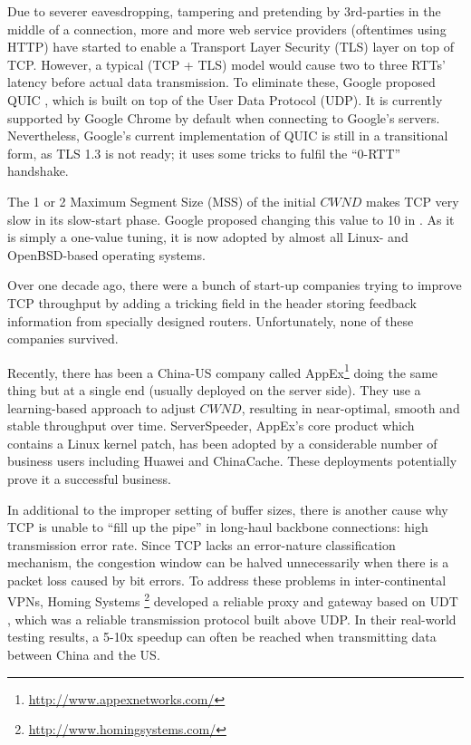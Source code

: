 Due to severer eavesdropping, tampering and pretending by 3rd-parties in the middle of a connection, more and more web service providers (oftentimes using HTTP) have started to enable a Transport Layer Security (TLS) layer on top of TCP. However, a typical (TCP + TLS) model would cause two to three RTTs' latency before actual data transmission. To eliminate these, Google proposed QUIC \cite{tsvwg-quic-protocol-02}, which is built on top of the User Data Protocol (UDP). It is currently supported by Google Chrome by default when connecting to Google's servers. Nevertheless, Google's current implementation of QUIC is still in a transitional form, as TLS 1.3 is not ready; it uses some tricks to fulfil the ``0-RTT'' handshake. 

The 1 or 2 Maximum Segment Size (MSS) of the initial $CWND$ makes TCP very slow in its slow-start phase. Google proposed changing this value to 10 in \cite{rfc6928}. As it is simply a one-value tuning, it is now adopted by almost all Linux- and OpenBSD-based operating systems. 

Over one decade ago, there were a bunch of start-up companies trying to improve TCP throughput by adding a tricking field in the header storing feedback information from specially designed routers. Unfortunately, none of these companies survived. 

Recently, there has been a China-US company called AppEx\footnote{\url{http://www.appexnetworks.com/}} doing the same thing but at a single end (usually deployed on the server side). They use a learning-based \cite{zhuang2014optimization} approach to adjust $CWND$, resulting in near-optimal, smooth and stable throughput over time. ServerSpeeder, AppEx's core product which contains a Linux kernel patch, has been adopted by a considerable number of business users including Huawei and ChinaCache. These deployments potentially prove it a successful business. 

In additional to the improper setting of buffer sizes, there is another cause why TCP is unable to ``fill up the pipe'' in long-haul backbone connections: high transmission error rate. Since TCP lacks an error-nature classification mechanism, the congestion window can be halved unnecessarily when there is a packet loss caused by bit errors. To address these problems in inter-continental VPNs, Homing Systems \footnote{\url{http://www.homingsystems.com/}} developed a reliable proxy and gateway based on UDT \cite{Gu:2007:UDT}, which was a reliable transmission protocol built above UDP. In their real-world testing results, a 5-10x speedup can often be reached when transmitting data between China and the US. 

